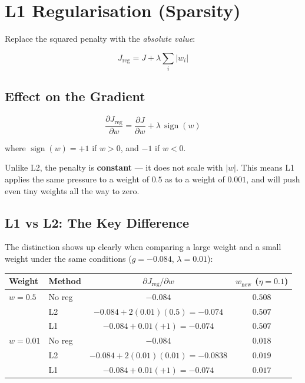 \documentclass[12pt, a4paper]{article}
\newif\ifstudentmode
\newcommand{\sol}[2][6cm]{%
  \ifstudentmode\underline{\hspace{#1}}\else{#2}\fi}
\theoremstyle{definition}
\begin{document}
\section{L1 Regularisation (Sparsity)}

Replace the squared penalty with the \emph{absolute value}:

\begin{resultbox}
\[
  J_{\text{reg}} = J + \lambda \sum_i |w_i|
\]
\end{resultbox}

\subsection{Effect on the Gradient}

\[
  \frac{\partial J_{\text{reg}}}{\partial w}
  = \frac{\partial J}{\partial w} + \sol[4cm]{\lambda\,\operatorname{sign}(w)}
\]

where $\operatorname{sign}(w) = +1$ if $w > 0$, and $-1$ if $w < 0$.

Unlike L2, the penalty is \textbf{constant} --- it does not scale with $|w|$.
This means L1 applies the same pressure to a weight of $0.5$ as to a weight
of $0.001$, and will push even tiny weights all the way to zero.

\subsection{L1 vs L2: The Key Difference}

The distinction shows up clearly when comparing a large weight and a small
weight under the same conditions ($g = -0.084$, $\lambda = 0.01$):

\begin{center}
\renewcommand{\arraystretch}{1.6}
\begin{tabular}{llcc}
\toprule
Weight & Method & $\partial J_{\text{reg}}/\partial w$ & $w_{\text{new}}$ ($\eta=0.1$) \\
\midrule
$w = 0.5$ & No reg       & $-0.084$                              & $0.508$ \\
           & L2           & $-0.084 + 2(0.01)(0.5) = -0.074$     & $0.507$ \\
           & L1           & $-0.084 + 0.01(+1) = -0.074$         & $0.507$ \\
\midrule
$w = 0.01$ & No reg      & $-0.084$                              & $0.018$ \\
            & L2          & $-0.084 + 2(0.01)(0.01) = -0.0838$   & $0.019$ \\
            & L1          & $-0.084 + 0.01(+1) = -0.074$         & $0.017$ \\
\bottomrule
\end{tabular}
\end{center}
\end{document}
